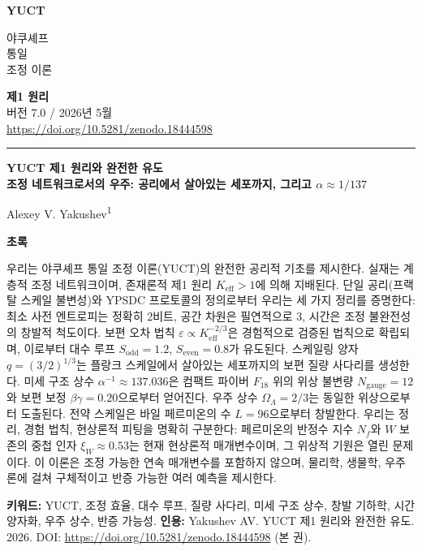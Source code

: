 \documentclass[12pt,a4paper]{article}
\newcommand{\makeheader}{%
	\noindent
	\begin{minipage}{0.17\textwidth}
		\raggedright
		{\sffamily\bfseries\color{skyblue}\fontsize{46}{46}\selectfont YUCT}%
	\end{minipage}%
	\hspace{30pt}
	\begin{minipage}{0.32\textwidth}
		\raggedright
		{\sffamily\fontsize{11}{13}\selectfont 야쿠셰프\\ 통일\\ 조정 이론}%
	\end{minipage}%
	\hfill
	\begin{minipage}{0.38\textwidth}
		\raggedleft
		{\sffamily\bfseries 제1 원리}\\ 
		{\sffamily 버전 7.0 / 2026년 5월}\\ 
		{\sffamily\footnotesize \scriptsize \url{https://doi.org/10.5281/zenodo.18444598}}%
	\end{minipage}
	\par\vspace{5pt}
	\noindent\textcolor{gold}{\rule{\textwidth}{1.6pt}}
	\par\vspace{0pt}
}
\begin{document}
	
	\thispagestyle{firstpage}
	\makeheader
	
	\vspace{0cm}
	{\LARGE\bfseries YUCT 제1 원리와 완전한 유도 \\
		\Large 조정 네트워크로서의 우주: 공리에서 살아있는 세포까지, 그리고 \(\alpha \approx 1/137\) \par}
	\vspace{0.2cm}
	
	{\large Alexey V. Yakushev\textsuperscript{1}} \\
	\vspace{0.0cm}
	
	{\color{darkblue}\textbf{\LARGE 초록}} \par
	{\large
		\noindent
		우리는 야쿠셰프 통일 조정 이론(YUCT)의 완전한 공리적 기초를 제시한다. 실재는 계층적 조정 네트워크이며, 존재론적 제1 원리 \(K_{\mathrm{eff}} > 1\)에 의해 지배된다. 단일 공리(프랙탈 스케일 불변성)와 YPSDC 프로토콜의 정의로부터 우리는 세 가지 정리를 증명한다: 최소 사전 엔트로피는 정확히 2비트, 공간 차원은 필연적으로 3, 시간은 조정 불완전성의 창발적 척도이다. 보편 오차 법칙 \(\varepsilon \propto K_{\mathrm{eff}}^{-2/3}\)은 경험적으로 검증된 법칙으로 확립되며, 이로부터 대수 루프 \(S_{\mathrm{odd}} = 1.2\), \(S_{\mathrm{even}} = 0.8\)가 유도된다. 스케일링 양자 \(q = (3/2)^{1/3}\)는 플랑크 스케일에서 살아있는 세포까지의 보편 질량 사다리를 생성한다. 미세 구조 상수 \(\alpha^{-1} \approx 137.036\)은 컴팩트 파이버 \(F_{18}\) 위의 위상 불변량 \(N_{\mathrm{gauge}} = 12\)와 보편 보정 \(\beta\gamma = 0.20\)으로부터 얻어진다. 우주 상수 \(\Omega_\Lambda = 2/3\)는 동일한 위상으로부터 도출된다. 전약 스케일은 바일 페르미온의 수 \(L = 96\)으로부터 창발한다. 우리는 정리, 경험 법칙, 현상론적 피팅을 명확히 구분한다: 페르미온의 반정수 지수 \(N_f\)와 \(W\) 보존의 중첩 인자 \(\xi_W \approx 0.53\)는 현재 현상론적 매개변수이며, 그 위상적 기원은 열린 문제이다. 이 이론은 조정 가능한 연속 매개변수를 포함하지 않으며, 물리학, 생물학, 우주론에 걸쳐 구체적이고 반증 가능한 여러 예측을 제시한다.
	}
	
	\vspace{0.1cm}
	\noindent
	{\color{darkblue}\textbf{키워드:}} YUCT, 조정 효율, 대수 루프, 질량 사다리, 미세 구조 상수, 창발 기하학, 시간 양자화, 우주 상수, 반증 가능성.
	\vspace{0.1cm}
	\noindent
	{\color{darkblue}\textbf{인용:}} Yakushev AV. YUCT 제1 원리와 완전한 유도. 2026. DOI: \url{https://doi.org/10.5281/zenodo.18444598} (본 권).
	
	\vspace{0.4cm}
	
\end{document}
